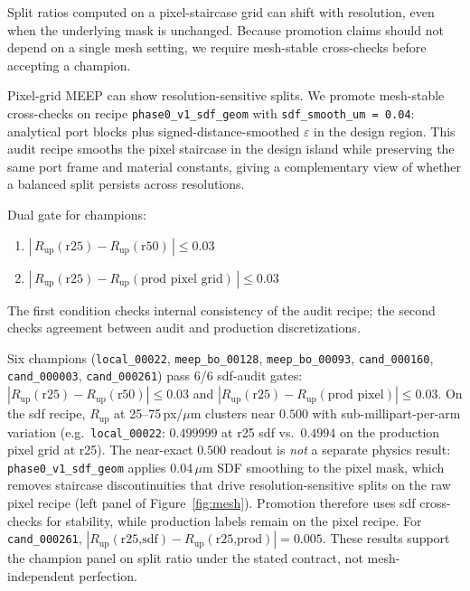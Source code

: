 \documentclass[11pt,a4paper]{article}
\begin{document}
Split ratios computed on a pixel-staircase grid can shift with resolution, even when the underlying mask is unchanged.
Because promotion claims should not depend on a single mesh setting, we require mesh-stable cross-checks before accepting a champion.

Pixel-grid MEEP can show resolution-sensitive splits.
We promote mesh-stable cross-checks on recipe \texttt{phase0\_v1\_sdf\_geom} with \texttt{sdf\_smooth\_um = 0.04}: analytical port blocks plus signed-distance-smoothed $\varepsilon$ in the design region.
This audit recipe smooths the pixel staircase in the design island while preserving the same port frame and material constants, giving a complementary view of whether a balanced split persists across resolutions.

Dual gate for champions:
\begin{enumerate}
  \item $|\,R_{\mathrm{up}}(\text{r25}) - R_{\mathrm{up}}(\text{r50})\,| \le 0.03$
  \item $|\,R_{\mathrm{up}}(\text{r25}) - R_{\mathrm{up}}(\text{prod pixel grid})\,| \le 0.03$
\end{enumerate}
The first condition checks internal consistency of the audit recipe; the second checks agreement between audit and production discretizations.

Six champions (\texttt{local\_00022}, \texttt{meep\_bo\_00128}, \texttt{meep\_bo\_00093}, \texttt{cand\_000160}, \texttt{cand\_000003}, \texttt{cand\_000261}) pass 6/6 sdf-audit gates: $|R_{\mathrm{up}}(\text{r25}) - R_{\mathrm{up}}(\text{r50})| \le 0.03$ and $|R_{\mathrm{up}}(\text{r25}) - R_{\mathrm{up}}(\text{prod pixel})| \le 0.03$.
On the sdf recipe, $R_{\mathrm{up}}$ at 25--75\,px/$\mu$m clusters near $0.500$ with sub-millipart-per-arm variation (e.g.\ \texttt{local\_00022}: $0.499999$ at r25 sdf vs.\ $0.4994$ on the production pixel grid at r25).
The near-exact $0.500$ readout is \emph{not} a separate physics result: \texttt{phase0\_v1\_sdf\_geom} applies 0.04\,$\mu$m SDF smoothing to the pixel mask, which removes staircase discontinuities that drive resolution-sensitive splits on the raw pixel recipe (left panel of Figure~\ref{fig:mesh}).
Promotion therefore uses sdf cross-checks for stability, while production labels remain on the pixel recipe.
For \texttt{cand\_000261}, $|R_{\mathrm{up}}(\text{r25,sdf}) - R_{\mathrm{up}}(\text{r25,prod})| = 0.005$.
These results support the champion panel on split ratio under the stated contract, not mesh-independent perfection.
\end{document}
